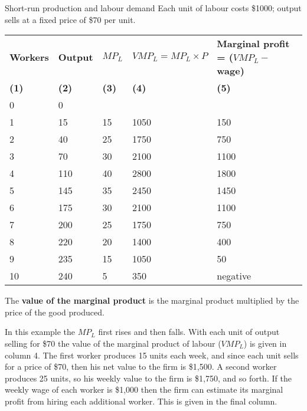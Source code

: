 \begin{Table}{26em}{Short-run production and labour demand \label{table:srprodlabourdemand}}{\centering Each unit of labour costs \$1000; output sells at a fixed price of \$70 per unit.}
\begin{tabu} to \linewidth {|X[1,c]X[1,c]X[1,c]X[1.5,c]X[1.5,c]|} \hline 
{}	\textbf{Workers} & \textbf{Output} & \textbf{$MP_L$} & \textbf{$VMP_L=MP_L\times P$} & \textbf{Marginal profit = ($VMP_L-$wage) } \\[-0.05em]
\textbf{(1)}	&	\textbf{(2)}	&	\textbf{(3)}	&	\textbf{(4)}	&	\textbf{(5)}	\\
						0 & 0	&		&		&			\\
	1 & 15	& 15	& 1050	& 150		\\
						2 & 40	& 25	& 1750	& 750		\\
	3 & 70	& 30	& 2100	& 1100		\\ 
						4 & 110 & 40	& 2800	& 1800		\\
	5 & 145 & 35	& 2450	& 1450		\\
						6 & 175 & 30	& 2100	& 1100		\\
	7 & 200 & 25	& 1750	& 750		\\
						8 & 220 & 20	& 1400	& 400		\\
	9 & 235 & 15	& 1050	& 50		\\
						10& 240 & 5		& 350	& negative	\\ \hline 
\end{tabu}
\end{Table}

\begin{DefBox}
The \textbf{value of the marginal product} is the marginal product multiplied by the price of the good produced.
\end{DefBox}

In this example the $MP_L$ first rises and then falls. With each unit of output selling for \$70 the value of the marginal product of labour ($VMP_L$) is given in column 4. The first worker produces 15 units each week, and since each unit sells for a price of \$70, then his net value to the firm is \$1,500. A second worker produces 25 units, so his weekly value to the firm is \$1,750, and so forth. If the weekly wage of each worker is \$1,000 then the firm can estimate its marginal profit from hiring each additional worker. This is given in the final column. 

